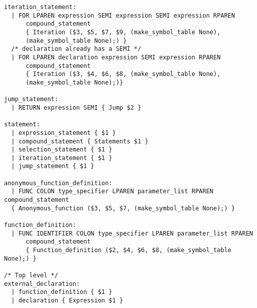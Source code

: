 \begin{verbatim}
iteration_statement:
  | FOR LPAREN expression SEMI expression SEMI expression RPAREN
      compound_statement
      { Iteration ($3, $5, $7, $9, (make_symbol_table None),
      (make_symbol_table None);) }
  /* declaration already has a SEMI */
  | FOR LPAREN declaration expression SEMI expression RPAREN
      compound_statement
      { Iteration ($3, $4, $6, $8, (make_symbol_table None), 
      (make_symbol_table None);)}

jump_statement:
  | RETURN expression SEMI { Jump $2 }

statement:
  | expression_statement { $1 }
  | compound_statement { Statements $1 }
  | selection_statement { $1 }
  | iteration_statement { $1 }
  | jump_statement { $1 }

anonymous_function_definition:
  | FUNC COLON type_specifier LPAREN parameter_list RPAREN compound_statement
  { Anonymous_function ($3, $5, $7, (make_symbol_table None);) }

function_definition:
  | FUNC IDENTIFIER COLON type_specifier LPAREN parameter_list RPAREN
      compound_statement
      { Function_definition ($2, $4, $6, $8, (make_symbol_table None);) }

/* Top level */
external_declaration:
  | function_definition { $1 }
  | declaration { Expression $1 }

\end{verbatim}